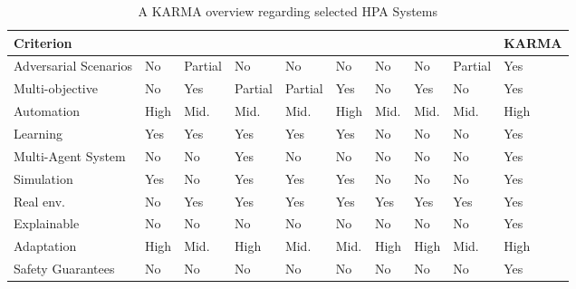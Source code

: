\documentclass[conference]{IEEEtran}
\begin{document}
\begin{table}[h!]
    \centering
    \caption{A KARMA overview regarding selected HPA Systems}
    \label{tab:autoscaling_criteria}
    {\scriptsize
    \renewcommand{\arraystretch}{1.1}
    \begin{tabular}{>{\raggedright\arraybackslash}m{1.22cm}>{\centering\arraybackslash}m{0.34cm}>{\centering\arraybackslash}m{0.34cm}>{\centering\arraybackslash}m{0.34cm}>{\centering\arraybackslash}m{0.34cm}>{\centering\arraybackslash}m{0.34cm}>{\centering\arraybackslash}m{0.34cm}>{\centering\arraybackslash}m{0.34cm}>{\centering\arraybackslash}m{0.34cm}>{\centering\arraybackslash}m{0.75cm}}
    \hline
    \textbf{Criterion} & \vspace{-0.3cm}\textbf{\cite{GymHPA}} & \vspace{-0.3cm}\textbf{\cite{AWARE}} & \vspace{-0.3cm}\textbf{\cite{IMAM}} & \vspace{-0.3cm}\textbf{\cite{Libra}} & \vspace{-0.3cm}\textbf{\cite{QoSRL}} & \vspace{-0.3cm}\textbf{\cite{AHPA}} & \vspace{-0.3cm}\textbf{\cite{KOSMOS}} & \vspace{-0.3cm}\textbf{\cite{COPA}} & \textbf{KARMA} \\
    \hline
    \hline
    Adversarial Scenarios & No & Partial & No & No & No & No & No & Partial & Yes \\
    \hline
    Multi-objective & No & Yes & Partial & Partial & Yes & No & Yes & No & Yes \\
    \hline
    Automation & High & Mid. & Mid. & Mid. & High & Mid. & Mid. & Mid. & High \\
    \hline
    Learning & Yes & Yes & Yes & Yes & Yes & No & No & No & Yes \\
    \hline
    Multi-Agent System & No & No & Yes & No & No & No & No & No & Yes \\
    \hline
    Simulation & Yes & No & Yes & Yes & Yes & No & No & No & Yes \\
    \hline
    Real env. & No & Yes & Yes & Yes & Yes & Yes & Yes & Yes & Yes \\
    \hline
    Explainable & No & No & No & No & No & No & No & No & Yes \\
    \hline
    Adaptation & High & Mid. & High & Mid. & Mid. & High & High & Mid. & High \\
    \hline
    Safety Guarantees & No & No & No & No & No & No & No & No & Yes \\
    \hline
    \end{tabular}%
    }
  \end{table}
\end{document}
